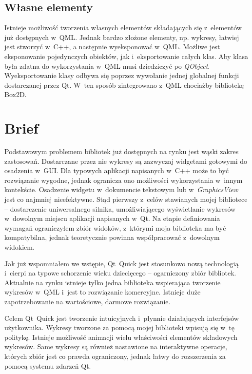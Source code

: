 \subsection{Własne elementy}
Istnieje możliwość tworzenia własnych elementów składających się z~elementów już dostępnych w~QML. Jednak bardzo złożone elementy, np. wykresy, łatwiej jest stworzyć w~C++, a następnie wyeksponować w~QML. Możliwe jest eksponowanie pojedynczych obiektów, jak i~eksportowanie całych klas. Aby klasa była zdatna do wykorzystania w~QML musi dziedziczyć po \textit{QObject}. Wyeksportowanie klasy odbywa się poprzez wywołanie jednej globalnej funkcji dostarczanej przez Qt. W~ten sposób zintegrowano z~QML chociażby bibliotekę Box2D.

\section{Brief}
Podstawowym problemem bibliotek już dostępnych na rynku jest wąski zakres zastosowań. Dostarczane przez nie wykresy są zazwyczaj widgetami gotowymi do osadzenia w~GUI. Dla typowych aplikacji napisanych w~C++ może to być rozwiązanie wygodne, jednak ogranicza ono możliwości wykorzystania w~innym kontekście. Osadzenie widgetu w~dokumencie tekstowym lub w~\textit{GraphicsView} jest co najmniej nieefektywne. Stąd pierwszy z~celów stawianych mojej bibliotece -- dostarczenie uniwersalnego silnika, umożliwiającego wyświetlanie wykresów w~dowolnym miejscu aplikacji napisanych w~Qt. Na etapie definiowania wymagań ograniczyłem zbiór widoków, z~którymi moja biblioteka ma być kompatybilna, jednak teoretycznie powinna współpracować z~dowolnym widokiem.

Jak już wspomniałem we wstępie, Qt~Quick jest stosunkowo nową technologią i~cierpi na typowe schorzenie wieku dziecięcego -- ogarniczony zbiór bibliotek. Aktualnie na rynku istnieje tylko jedna biblioteka wspierająca tworzenie wykresów w~QML i~jest to rozwiązanie komercyjne. Istnieje duże zapotrzebowanie na wartościowe, darmowe rozwiązanie.

Celem Qt~Quick jest tworzenie intuicyjnych i~płynnie działających interfejsów użytkownika. Wykresy tworzone za pomocą mojej biblioteki wpisują się w~tę politykę. Istnieje możliwość animacji wielu właściwości elementów składowych wykresów. Same wykresy są również nastawione na interaktywne operacje, których zbiór jest co prawda ograniczony, jednak łatwy do rozszerzenia za pomocą systemu zdarzeń Qt.

